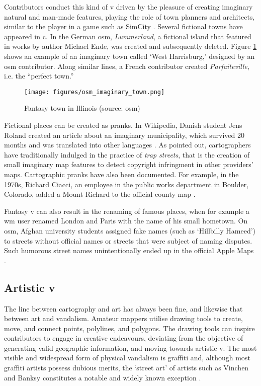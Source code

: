 \documentclass{article} \usepackage{graphicx,xspace}
\begin{document}
Contributors conduct this kind of \gls{v} driven by the pleasure of creating imaginary natural and man-made features, playing the role of town planners and architects, similar to the player in a game such as SimCity \citep{shepherd:2009:videogamesgis}.
Several fictional towns have appeared in \gls{c}.
In the German \gls{osm}, \emph{Lummerland}, a fictional island that featured in works by author Michael Ende, was created and subsequently deleted.
Figure \ref{fig:osm_imaginary_town} shows an example of an imaginary town called `West Harrisburg,' designed by an \gls{osm} contributor.
Along similar lines, a French contributor created \emph{Parfaiteville}, i.e. the ``perfect town.''




\begin{figure}
\centering
\texttt{[image: figures/osm\_imaginary\_town.png]}
\caption{Fantasy town in Illinois (source: \protect\gls{osm})}
\label{fig:osm_imaginary_town}
\end{figure}

Fictional places can be created as pranks.
In Wikipedia, Danish student Jens Roland created an article about an imaginary municipality, which survived 20 months and was translated into other languages \citep{nielsen:2012:wikipediasurvey}.
As \cite{monmonier:1996:liewithmaps} pointed out, cartographers have traditionally indulged in the practice of \emph{trap streets}, that is the creation of small imaginary map features to detect copyright infringment in other providers' maps. Cartographic pranks have also been documented.
For example, in the 1970s, Richard Ciacci, an employee in the public works department in Boulder, Colorado, added a Mount Richard to the official county map \citep{monmonier:1996:liewithmaps}.


Fantasy \gls{v} can also result in the renaming of famous places, when for example a \gls{wm} user renamed London and Paris with the name of his small hometown.
On \gls{osm}, Afghan university students assigned fake names (such as `Hillbilly Hameed') to streets without official names or streets that were subject of naming disputes.
Such humorous street names unintentionally ended up in the official Apple Maps \citep{moore:2013:afghanamateurs}.

\subsection{Artistic \protect\gls{v}}

The line between cartography and art has always been fine, and likewise that between art and vandalism.
Amateur mappers utilise drawing tools to create, move, and connect points, polylines, and polygons.
The drawing tools can inspire contributors to engage in creative endeavours, deviating from the objective of generating valid geographic information, and moving towards artistic \gls{v}.
The most visible and widespread form of physical vandalism is graffiti and, although most graffiti artists possess dubious merits, the `street art' of artists such as Vinchen and Banksy constitutes a notable and widely known exception \citep{lewisohn:2008:streetart}.
\end{document}
